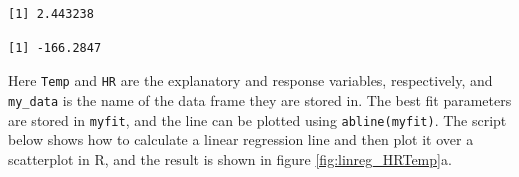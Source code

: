 \documentclass[
  letterpaper,
  DIV=11,
  numbers=noendperiod]{scrreprt}
\newenvironment{Shaded}{\begin{snugshade}}{\end{snugshade}}
\newcommand{\AttributeTok}[1]{\textcolor[rgb]{0.40,0.45,0.13}{#1}}
\newcommand{\DecValTok}[1]{\textcolor[rgb]{0.68,0.00,0.00}{#1}}
\newcommand{\FloatTok}[1]{\textcolor[rgb]{0.68,0.00,0.00}{#1}}
\newcommand{\FunctionTok}[1]{\textcolor[rgb]{0.28,0.35,0.67}{#1}}
\newcommand{\NormalTok}[1]{\textcolor[rgb]{0.00,0.23,0.31}{#1}}
\newcommand{\OtherTok}[1]{\textcolor[rgb]{0.00,0.23,0.31}{#1}}
\newcommand{\SpecialCharTok}[1]{\textcolor[rgb]{0.37,0.37,0.37}{#1}}
\newcommand{\StringTok}[1]{\textcolor[rgb]{0.13,0.47,0.30}{#1}}
\begin{document}
\begin{Shaded}
\end{Shaded}

\begin{verbatim}
[1] 2.443238
\end{verbatim}

\begin{Shaded}
\end{Shaded}

\begin{verbatim}
[1] -166.2847
\end{verbatim}

Here \texttt{Temp} and \texttt{HR} are the explanatory and response
variables, respectively, and \texttt{my\_data} is the name of the data
frame they are stored in. The best fit parameters are stored in
\texttt{myfit}, and the line can be plotted using
\texttt{abline(myfit)}. The script below shows how to calculate a linear
regression line and then plot it over a scatterplot in R, and the result
is shown in figure \ref{fig:linreg_HRTemp}a.

\begin{Shaded}
\end{Shaded}
\end{document}
